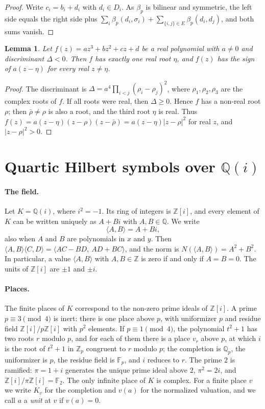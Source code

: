 \documentclass[11pt]{article}
\newtheorem{lemma}[theorem]{Lemma}
\newcommand{\Z}{\mathbb{Z}}
\newcommand{\Q}{\mathbb{Q}}
\newcommand{\F}{\mathbb{F}}
\begin{document}
\begin{proof}
Write $c_i=b_i+d_i$ with $d_i\in D_i$. As $\beta_p$ is bilinear and symmetric, the left side equals the right side plus $\sum_i\beta_p(d_i,\sigma_i)+\sum_{\{i,j\}\in E}\beta_p(d_i,d_j)$, and both sums vanish.
\end{proof}

\begin{lemma}\label{lem:cubic}
Let $f(z)=az^3+bz^2+cz+d$ be a real polynomial with $a\neq0$ and discriminant $\Delta<0$. Then $f$ has exactly one real root $\eta$, and $f(z)$ has the sign of $a(z-\eta)$ for every real $z\neq\eta$.
\end{lemma}

\begin{proof}
The discriminant is $\Delta=a^4\prod_{i<j}(\rho_i-\rho_j)^2$, where $\rho_1,\rho_2,\rho_3$ are the complex roots of $f$. If all roots were real, then $\Delta\geq0$. Hence $f$ has a non-real root $\rho$; then $\bar\rho\neq\rho$ is also a root, and the third root $\eta$ is real. Thus $f(z)=a(z-\eta)(z-\rho)(z-\bar\rho)=a(z-\eta)|z-\rho|^2$ for real $z$, and $|z-\rho|^2>0$.
\end{proof}



\section{\texorpdfstring{Quartic Hilbert symbols over $\Q(i)$}{Quartic Hilbert symbols over Q(i)}}\label{sec:csymbols}

\paragraph{The field.} Let $K=\Q(i)$, where $i^2=-1$. Its ring of integers is $\Z[i]$, and every element of $K$ can be written uniquely as $A+Bi$ with $A,B\in\Q$. We write
\[
\langle A,B\rangle=A+Bi,
\]
also when $A$ and $B$ are polynomials in $x$ and $y$. Then $\langle A,B\rangle\langle C,D\rangle=\langle AC-BD,\ AD+BC\rangle$, and the norm is $N(\langle A,B\rangle)=A^2+B^2$. In particular, a value $\langle A,B\rangle$ with $A,B\in\Z$ is zero if and only if $A=B=0$. The units of $\Z[i]$ are $\pm1$ and $\pm i$.

\paragraph{Places.} The finite places of $K$ correspond to the non-zero prime ideals of $\Z[i]$. A prime $p\equiv3\pmod4$ is inert: there is one place above $p$, with uniformizer $p$ and residue field $\Z[i]/p\Z[i]$ with $p^2$ elements. If $p\equiv1\pmod4$, the polynomial $t^2+1$ has two roots $r$ modulo $p$, and for each of them there is a place $v_r$ above $p$, at which $i$ is the root of $t^2+1$ in $\Z_p$ congruent to $r$ modulo $p$; the completion is $\Q_p$, the uniformizer is $p$, the residue field is $\F_p$, and $i$ reduces to $r$. The prime $2$ is ramified: $\pi=1+i$ generates the unique prime ideal above $2$, $\pi^2=2i$, and $\Z[i]/\pi\Z[i]=\F_2$. The only infinite place of $K$ is complex. For a finite place $v$ we write $K_v$ for the completion and $v(a)$ for the normalized valuation, and we call $a$ a \emph{unit} at $v$ if $v(a)=0$.
\end{document}
